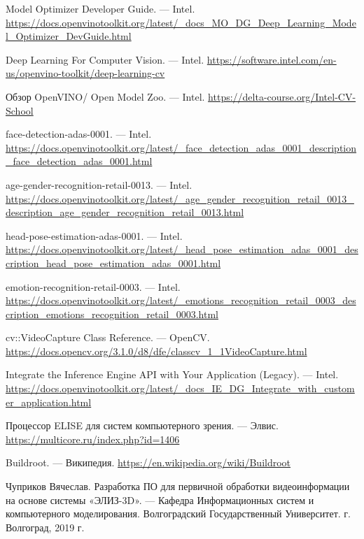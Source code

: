 \documentclass[14pt,a4paper]{scrartcl}
\begin{document}
\begin{thebibliography}{9}
	Model Optimizer Developer Guide.
	\newblock --- Intel. \url{https://docs.openvinotoolkit.org/latest/_docs_MO_DG_Deep_Learning_Model_Optimizer_DevGuide.html}	
	
	Deep Learning For Computer Vision.
	\newblock --- Intel. \url{https://software.intel.com/en-us/openvino-toolkit/deep-learning-cv}
	
	Обзор OpenVINO/ Open Model Zoo.
	\newblock --- Intel. \url{https://delta-course.org/Intel-CV-School}
	
	face-detection-adas-0001.
	\newblock --- Intel. \url{https://docs.openvinotoolkit.org/latest/_face_detection_adas_0001_description_face_detection_adas_0001.html}
	
	age-gender-recognition-retail-0013.
	\newblock --- Intel. \url{https://docs.openvinotoolkit.org/latest/_age_gender_recognition_retail_0013_description_age_gender_recognition_retail_0013.html}
	
	head-pose-estimation-adas-0001.
	\newblock --- Intel. \url{https://docs.openvinotoolkit.org/latest/_head_pose_estimation_adas_0001_description_head_pose_estimation_adas_0001.html}
	
	emotion-recognition-retail-0003.
	\newblock --- Intel. \url{https://docs.openvinotoolkit.org/latest/_emotions_recognition_retail_0003_description_emotions_recognition_retail_0003.html}
	
	cv::VideoCapture Class Reference.
	\newblock --- OpenCV. \url{https://docs.opencv.org/3.1.0/d8/dfe/classcv_1_1VideoCapture.html}
	
	Integrate the Inference Engine API with Your Application (Legacy).
	\newblock --- Intel. \url{https://docs.openvinotoolkit.org/latest/_docs_IE_DG_Integrate_with_customer_application.html}
	
	Процессор ELISE для систем компьютерного зрения.
	\newblock --- Элвис. \url{https://multicore.ru/index.php?id=1406}
	
	Buildroot.
	\newblock --- Википедия. \url{https://en.wikipedia.org/wiki/Buildroot}
	
	Чуприков Вячеслав. Разработка ПО для первичной обработки видеоинформации на основе системы «ЭЛИЗ-3D».
	\newblock --- Кафедра Информационных систем и компьютерного моделирования. Волгоградский Государственный Университет. г. Волгоград, 2019 г.
	

\end{thebibliography}
\end{document}
